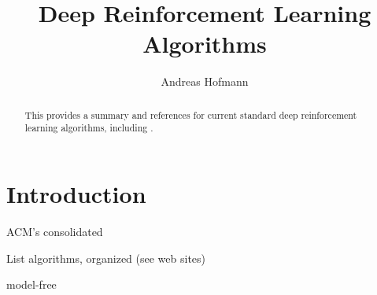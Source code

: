 \documentclass[acmlarge,screen]{acmart}
\begin{document}
%
\title{Deep Reinforcement Learning Algorithms}

%
\author{Andreas Hofmann}

%
\renewcommand{\shortauthors}{Hofmann}

%
\begin{abstract}
This provides a summary and references for current standard deep reinforcement learning algorithms, including .
\end{abstract}


%

%
\maketitle

\section{Introduction}
ACM's consolidated 

List algorithms, organized (see web sites)

model-free
\end{document}
